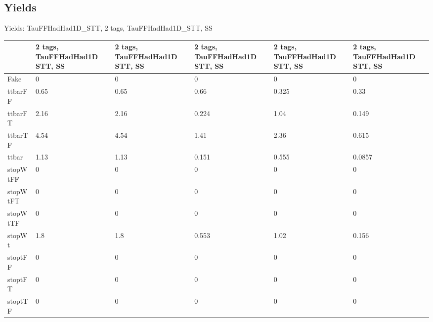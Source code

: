 
\subsection{Yields}

\begin{frame}{Yields: TauFFHadHad1D\_STT, 2 tags, TauFFHadHad1D\_STT, SS}
\begin{center}
  \begin{tabular}{l| >{\centering\let\newline\\\arraybackslash\hspace{0pt}}m{1.4cm}| >{\centering\let\newline\\\arraybackslash\hspace{0pt}}m{1.4cm}| >{\centering\let\newline\\\arraybackslash\hspace{0pt}}m{1.4cm}| >{\centering\let\newline\\\arraybackslash\hspace{0pt}}m{1.4cm}| >{\centering\let\newline\\\arraybackslash\hspace{0pt}}m{1.4cm}}
    & 2 tags, TauFFHadHad1D\_STT, SS & 2 tags, TauFFHadHad1D\_STT, SS & 2 tags, TauFFHadHad1D\_STT, SS & 2 tags, TauFFHadHad1D\_STT, SS & 2 tags, TauFFHadHad1D\_STT, SS \\
 \hline \hline
    Fake& 0 & 0 & 0 & 0 & 0 \\
 \hline
    ttbarFF& 0.65 & 0.65 & 0.66 & 0.325 & 0.33 \\
 \hline
    ttbarFT& 2.16 & 2.16 & 0.224 & 1.04 & 0.149 \\
 \hline
    ttbarTF& 4.54 & 4.54 & 1.41 & 2.36 & 0.615 \\
 \hline
    ttbar& 1.13 & 1.13 & 0.151 & 0.555 & 0.0857 \\
 \hline
    stopWtFF& 0 & 0 & 0 & 0 & 0 \\
 \hline
    stopWtFT& 0 & 0 & 0 & 0 & 0 \\
 \hline
    stopWtTF& 0 & 0 & 0 & 0 & 0 \\
 \hline
    stopWt& 1.8 & 1.8 & 0.553 & 1.02 & 0.156 \\
 \hline
    stoptFF& 0 & 0 & 0 & 0 & 0 \\
 \hline
    stoptFT& 0 & 0 & 0 & 0 & 0 \\
 \hline
    stoptTF& 0 & 0 & 0 & 0 & 0 \\

\end{tabular}
\end{center}
\end{frame}

